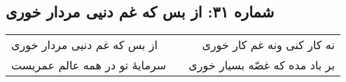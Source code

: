 \begin{center}
\section*{شماره ۳۱: از بس که غم دنیی مردار خوری}
\label{sec:031}
\begin{longtable}{l p{0.5cm} r}
از بس که غم دنیی مردار خوری
&&
نه کار کنی ونه غم کار خوری
\\
سرمایهٔ تو در همه عالم عمریست
&&
بر باد مده که غصّه بسیار خوری
\\
\end{longtable}
\end{center}
